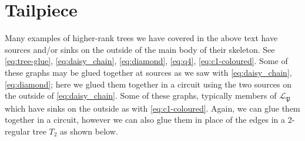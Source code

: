 \documentclass[12pt]{amsart}
\theoremstyle{definition}
\theoremstyle{remark}
\numberwithin{equation}{section}
\begin{document}
\section{Tailpiece} \label{sec:tailpiece}

Many examples of higher-rank trees we have covered in the above text have sources and/or sinks on the outside of the main body of their skeleton. See \eqref{eq:tree-glue}, \eqref{eq:daisy_chain}, \eqref{eq:diamond}, \eqref{eq:q4}, \eqref{eq:c1-coloured}. Some of these graphs may be glued together at sources as we saw with \eqref{eq:daisy_chain}, \eqref{eq:diamond}; here we glued them together in a circuit using the two sources on the outside of \eqref{eq:daisy_chain}. Some of these graphs, typically members of $\mathcal{L}_{\mathfrak{P}}$ which have sinks on the outside as with \eqref{eq:c1-coloured}. Again, we can glue them together in a circuit, however we can also glue them in place of the edges in a 2-regular tree $T_2$ as shown below.
\end{document}
